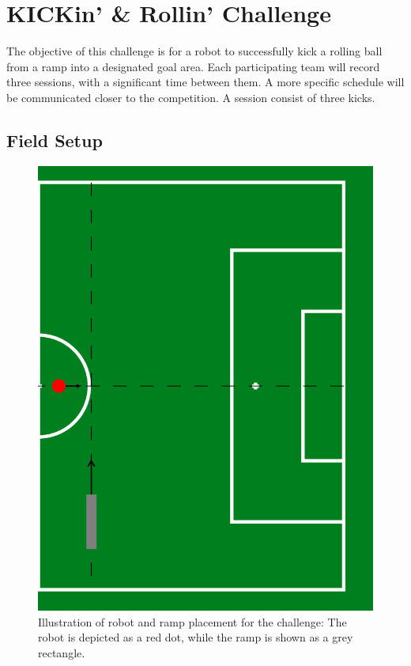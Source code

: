 \section{KICKin' \& Rollin' Challenge}

The objective of this challenge is for a robot to successfully kick a rolling ball from a ramp into a designated goal area. 
Each participating team will record three sessions, with a significant time between them.
A more specific schedule will be communicated closer to the competition.
A session consist of three kicks. 

\subsection{Field Setup}
\label{sec:field-setup}

\begin{figure}[t]
    \centerline{\includegraphics[width=\columnwidth/2]{figs/KICKin-Rollin-Placement-figure.png}}
    \caption{Illustration of robot and ramp placement for the challenge: The robot is depicted as a red dot, while the ramp is shown as a grey rectangle.}
    \label{fig:KICKin-Rolling-Challenge}
\end{figure}

